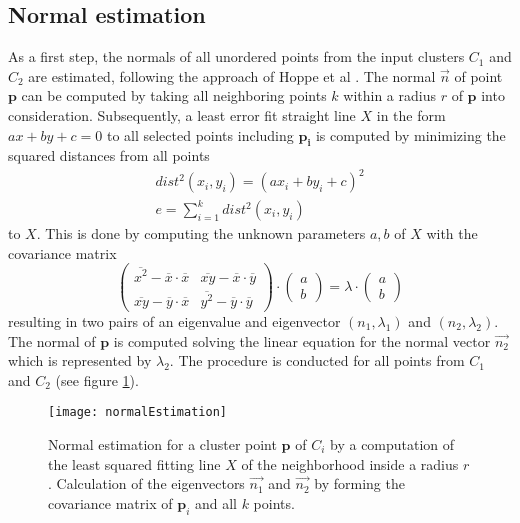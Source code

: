 \subsection{Normal estimation}
\label{normal}
As a first step, the normals of all unordered points from the input clusters $C_1$ and $C_2$ are estimated, following the approach of Hoppe et al \cite{normals}. The normal $\vec{n}$ of point $\boldsymbol{p}$ can be computed by taking all neighboring points $k$ within a radius $r$ of $\boldsymbol{p}$ into consideration. Subsequently, a least error fit straight line $X$ in the form $ax + by +c = 0$ to all selected points including $\boldsymbol{p_i}$ is computed by minimizing the squared distances from all points
\begin{equation}
\begin{split}
dist^2(x_i, y_i) = (ax_i + by_i + c)^2
\\
e =   \displaystyle\sum_{i=1}^{k} dist^2(x_i, y_i)
\end{split}
\end{equation}
to $X$. This is done by computing the unknown parameters $a, b$ of $X$ with the covariance matrix 
\begin{equation}
\begin{pmatrix}
\overline{x^2} - \overline{x} \cdot \overline{x} & \overline{xy} -\overline{x} \cdot \overline{y}\\
\overline{xy} -\overline{y} \cdot \overline{x} & \overline{y^2} -\overline{y} \cdot \overline{y}
\end{pmatrix} \cdot \begin{pmatrix}
a \\
b
\end{pmatrix} = \lambda \cdot \begin{pmatrix}
a \\
b
\end{pmatrix}
\end{equation}
resulting in two pairs of an eigenvalue and eigenvector $(n_1,\lambda_1)$ and $(n_2,\lambda_2)$. The normal of $\boldsymbol{p}$ is computed solving the linear equation for the normal vector $\vec{n_2}$ which is represented by $\lambda_2$. The procedure is conducted for all points from $C_1$ and $C_2$ (see figure \ref{fig:normalEstimation}). 
\begin{figure}[H]
	\centering
	\texttt{[image: normalEstimation]}
	\caption{Normal estimation for a cluster point $\boldsymbol{p}$ of $C_i$ by a computation of the least squared fitting line $X$ of the neighborhood inside a radius $r$. Calculation of the eigenvectors $\vec{n_1}$ and $\vec{n_2}$ by forming the covariance matrix of  $\boldsymbol{p}_i$ and all $k$ points.}
	\label{fig:normalEstimation}
\end{figure}
